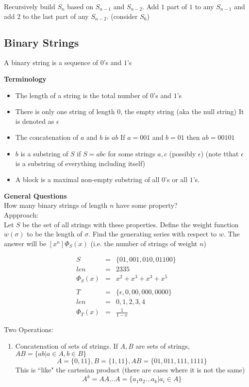 \documentclass{article}
\begin{document}
{{Recursively build $S_n$ based on $S_{n-1}$ and $S_{n-2}$. Add $1$ part of $1$ to any $S_{n-1}$ and add $2$ to the last part of any $S_{n-2}$. (consider $S_6$)

\subsection{Binary Strings}
A binary string is a sequence of $0$'s and $1$'s

\textbf{Terminology}
\begin{itemize}
	\item The length of a string is the total number of $0$'s and $1$'s
	\item There is only one string of length $0$, the empty string (aka the null string) It is denoted as $\epsilon$
	\item The concatenation of $a$ and $b$ is $ab$
		If $a=001$ and $b=01$ then $ab=00101$
	\item $b$ is a substring of $S$ if $S=abc$ for some strings $a,c$ (possibly $\epsilon$) (note tthat $\epsilon$ is a substring of everything including itself)
	\item A block is a maximal non-empty substring of all $0$'s or all $1$'s.
\end{itemize}

\textbf{General Questions}\\
How many binary strings of length $n$ have some property?\\
Appproach:\\
Let $S$ be the set of all strings with these properties. Define the weight function $w(\sigma)$ to be the length of $\sigma$. Find the generating series with respect to $w$. The answer will be $[x^n]\Phi_S(x)$ (i.e. the number of strings of weight $n$)

\example
\begin{eqnarray*}
	S &=&  \{01, 001, 010, 01100 \} \\
	len &=& 2 3 3 5 \\
	\Phi_S(x) &=& x^2 + x^3 + x^3 + x^5\\
	\\
	T &=&  \{\epsilon, 0, 00, 000, 0000 \} \\
	len &=& 0,1,2,3,4 \\
	\Phi_T(x) &=& \frac{1}{1-x}
\end{eqnarray*}

Two Operations:
\begin{enumerate}
	\item Concatenation of sets of strings. If $A,B$ are sets of strings, $AB = \{ab | a \in A, b \in B \}$
		\example
		$$A = \{0,11\}, B=\{1,11\}, AB = \{01,011,111,1111 \}$$
		This is ``like" the cartesian product (there are cases where it is not the same)
		$$A^k = AA \dots A = \{a_1a_2 \dots a_k | a_i \in A \}$$ %


\end{enumerate}}}
\end{document}
